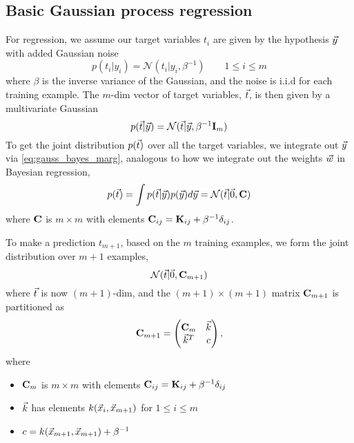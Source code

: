 \documentclass[11pt]{article}
\begin{document}
\subsection{Basic Gaussian process regression}
For regression, we assume our target variables $t_i$ are given by the hypothesis $\vec{y}$
with added Gaussian noise
\begin{equation}
  p(t_i | y_i) = \mathcal{N}(t_i | y_i, \beta^{-1}) \qquad 1 \leq i \leq m
\end{equation}
where $\beta$ is the inverse variance of the Gaussian, and the noise is i.i.d for each
training example. The $m$-dim vector of target variables, $\vec{t}$, is then given by a
multivariate Gaussian
\begin{equation}
  p(\vec{t} | \vec{y}) = \mathcal{N}(\vec{t} | \vec{y}, \beta^{-1} \mathbf{I}_m)
\end{equation}
To get the joint distribution $p(\vec{t})$ over all the target variables, we integrate out
$\vec{y}$ via \eqref{eq:gauss_bayes_marg}, analogous to how we integrate out the weights
$\vec{w}$ in Bayesian regression,
\begin{equation}
  p(\vec{t}) = \int p(\vec{t} | \vec{y}) p(\vec{y}) d\vec{y} = \mathcal{N}(\vec{t} | \vec{0}, \mathbf{C})
\end{equation}
where $\mathbf{C}$ is $m \times m$ with elements
$\mathbf{C}_{ij} = \mathbf{K}_{ij} + \beta^{-1} \delta_{ij}$.

To make a prediction $t_{m+1}$, based on the $m$ training examples, we form the joint
distribution over $m+1$ examples,
\begin{equation}
  \mathcal{N}(\vec{t} | \vec{0}, \mathbf{C}_{m+1})
\end{equation}
where $\vec{t}$ is now $(m+1)$-dim, and the $(m+1) \times (m+1)$ matrix
$\mathbf{C}_{m+1}$ is partitioned as
\begin{equation}
  \mathbf{C}_{m+1} = 
  \left(
    \begin{matrix}
      \mathbf{C}_m & \vec{k}\\
      \vec{k}^T   & c
    \end{matrix}
  \right),
\end{equation}
where
\begin{itemize}
  \item $\mathbf{C}_m$ is $m \times m$ with elements
  $\mathbf{C}_{ij} = \mathbf{K}_{ij} + \beta^{-1} \delta_{ij}$
  \item $\vec{k}$ has elements $k(\vec{x}_i, \vec{x}_{m+1})$ for $1 \leq i \leq m$
  \item $c = k(\vec{x}_{m+1}, \vec{x}_{m+1}) + \beta^{-1}$
\end{itemize}
\end{document}
